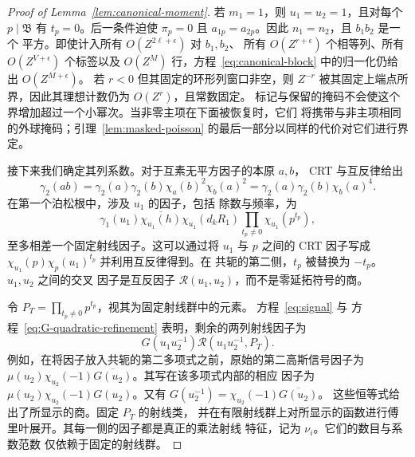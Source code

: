 \documentclass[11pt,a4paper]{article}
\numberwithin{equation}{section}
\numberwithin{figure}{section}
\theoremstyle{definition}
\theoremstyle{remark}
\begin{document}
\begin{proof}[Proof of Lemma~\ref{lem:canonical-moment}]
若 \(m_1=1\)，则 \(u_1=u_2=1\)，且对每个
\(p\mid\mathfrak B\) 有 \(t_p=0\)。后一条件迫使 \(\pi_p=0\)
且 \(a_{1p}=a_{2p}\)。因此 \(n_1=n_2\)，且 \(b_1b_2\) 是一个
平方。即使计入所有 \(O(Z^{2\ell+\epsilon})\) 对 \(b_1,b_2\)、
所有 \(O(Z^{r+\epsilon})\) 个相等列、所有 \(O(Z^{V+\epsilon})\)
个标签以及 \(O(Z^M)\) 行，方程~\eqref{eq:canonical-block} 中的归一化仍给出 \(O(Z^{M+\epsilon})\)。
若 \(r<0\) 但其固定的环形列窗口非空，则
\(Z^{-r}\) 被其固定上端点所界，因此其理想计数仍为 \(O(Z^r)\)，且常数固定。
标记与保留的掩码不会使这个界增加超过一个小幂次。当非零主项在下面被恢复时，它们
将携带与非主项相同的外球掩码；引理~\ref{lem:masked-poisson} 的最后一部分以同样的代价对它们进行界定。

接下来我们确定其列系数。对于互素无平方因子的本原 \(a,b\)，
CRT 与互反律给出
\[
 \gamma_2(ab)=\gamma_2(a)\gamma_2(b)
       \chi_a(b)^2\chi_b(a)^2
 =\gamma_2(a)\gamma_2(b)\chi_b(a)^4.
\]
在第一个泊松根中，涉及 \(u_1\) 的因子，包括
除数与频率，为
\[
 \gamma_1(u_1)\overline{\chi_{u_1}(h)}
 \chi_{u_1}(d_kR_1)\prod_{t_p\ne0}\chi_{u_1}(p^{t_p}),
\]
至多相差一个固定射线因子。这可以通过将 \(u_1\) 与 \(p\) 之间的 CRT 因子写成
\(\chi_{u_1}(p)\chi_p(u_1)^{t_p}\) 并利用互反律得到。在
共轭的第二侧，\(t_p\) 被替换为 \(-t_p\)。\(u_1,u_2\) 之间的交叉
因子是互反因子
\(\mathcal R(u_1,u_2)\)，而不是零延拓符号的商。

令 \(P_T=\prod_{t_p\ne0}p^{t_p}\)，视其为固定射线群中的元素。
方程~\eqref{eq:signal} 与
方程~\eqref{eq:G-quadratic-refinement} 表明，剩余的两列射线因子为
\[
 G(u_1u_2^{-1})\mathcal R(u_1u_2^{-1},P_T).
\]
例如，在将因子放入共轭的第二多项式之前，原始的第二高斯信号因子为
\(\mu(u_2)\chi_{u_2}(-1)\overline{G(u_2)}\)。其写在该多项式内部的相应
因子为
\(\mu(u_2)\chi_{u_2}(-1)G(u_2)\)。又有
\(G(u_2^{-1})=\chi_{u_2}(-1)\overline{G(u_2)}\)。
这些恒等式给出了所显示的商。固定 \(P_T\) 的射线类，
并在有限射线群上对所显示的函数进行傅里叶展开。其每一侧的因子都是真正的乘法射线
特征，记为 \(\nu_i\)。它们的数目与系数范数
仅依赖于固定的射线群。


\end{proof}
\end{document}
